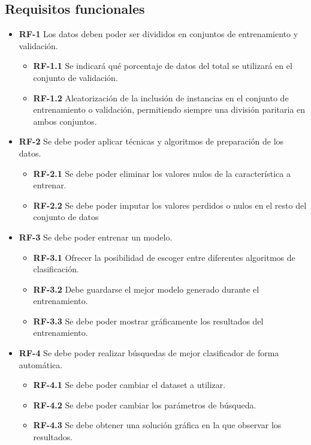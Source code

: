 \subsection{Requisitos funcionales}
\begin{itemize}

    \item \textbf{RF-1} Los datos deben poder ser divididos en conjuntos de entrenamiento y validación.
        \begin{itemize}
            \item \textbf{RF-1.1} Se indicará qué porcentaje de datos del total se utilizará en el conjunto de validación.
            \item \textbf{RF-1.2} Aleatorización de la inclusión de instancias en el conjunto de entrenamiento o validación, permitiendo siempre una división paritaria en ambos conjuntos.        
        \end{itemize}
    
    \item \textbf{RF-2} Se debe poder aplicar técnicas y algoritmos de preparación de los datos.
        \begin{itemize}
            \item \textbf{RF-2.1} Se debe poder eliminar los valores nulos de la característica a entrenar.
            \item \textbf{RF-2.2} Se debe poder imputar los valores perdidos o nulos en el resto del conjunto de datos
        \end{itemize}
    
    \item \textbf{RF-3} Se debe poder entrenar un modelo.
        \begin{itemize}
            \item \textbf{RF-3.1} Ofrecer la posibilidad de escoger entre diferentes algoritmos de clasificación.
            \item \textbf{RF-3.2} Debe guardarse el mejor modelo generado durante el entrenamiento.
            \item \textbf{RF-3.3} Se debe poder mostrar gráficamente los resultados del entrenamiento.
        \end{itemize}

    \item \textbf{RF-4} Se debe poder realizar búsquedas de mejor clasificador de forma automática.
        \begin{itemize}
            \item \textbf{RF-4.1} Se debe poder cambiar el dataset a utilizar.
            \item \textbf{RF-4.2} Se debe poder cambiar los parámetros de búsqueda.
            \item \textbf{RF-4.3} Se debe obtener una solución gráfica en la que observar los resultados.
        \end{itemize}


\end{itemize}
